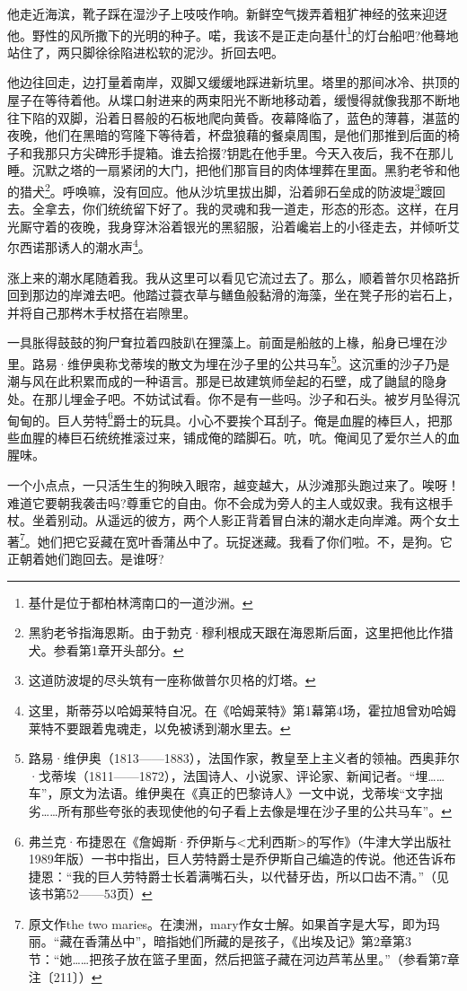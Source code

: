 \par 他走近海滨，靴子踩在湿沙子上吱吱作响。新鲜空气拨弄着粗犷神经的弦来迎迓他。野性的风所撒下的光明的种子。喏，我该不是正走向基什\footnote{基什是位于都柏林湾南口的一道沙洲。}的灯台船吧?他蓦地站住了，两只脚徐徐陷进松软的泥沙。折回去吧。
\par 他边往回走，边打量着南岸，双脚又缓缓地踩进新坑里。塔里的那间冰冷、拱顶的屋子在等待着他。从堞口射进来的两束阳光不断地移动着，缓慢得就像我那不断地往下陷的双脚，沿着日晷般的石板地爬向黄昏。夜幕降临了，蓝色的薄暮，湛蓝的夜晚，他们在黑暗的穹隆下等待着，杯盘狼藉的餐桌周围，是他们那推到后面的椅子和我那只方尖碑形手提箱。谁去拾掇?钥匙在他手里。今天入夜后，我不在那儿睡。沉默之塔的一扇紧闭的大门，把他们那盲目的肉体埋葬在里面。黑豹老爷和他的猎犬\footnote{黑豹老爷指海恩斯。由于勃克·穆利根成天跟在海恩斯后面，这里把他比作猎犬。参看第1章开头部分。}。呼唤嘛，没有回应。他从沙坑里拔出脚，沿着卵石垒成的防波堤\footnote{这道防波堤的尽头筑有一座称做普尔贝格的灯塔。}踱回去。全拿去，你们统统留下好了。我的灵魂和我一道走，形态的形态。这样，在月光厮守着的夜晚，我身穿沐浴着银光的黑貂服，沿着巉岩上的小径走去，并倾听艾尔西诺那诱人的潮水声\footnote{这里，斯蒂芬以哈姆莱特自况。在《哈姆莱特》第1幕第4场，霍拉旭曾劝哈姆莱特不要跟着鬼魂走，以免被诱到潮水里去。}。
\par 涨上来的潮水尾随着我。我从这里可以看见它流过去了。那么，顺着普尔贝格路折回到那边的岸滩去吧。他踏过蓑衣草与鳝鱼般黏滑的海藻，坐在凳子形的岩石上，并将自己那梣木手杖搭在岩隙里。
\par 一具胀得鼓鼓的狗尸耷拉着四肢趴在狸藻上。前面是船舷的上椽，船身已埋在沙里。路易·维伊奥称戈蒂埃的散文为埋在沙子里的公共马车\footnote{路易·维伊奥（1813——1883），法国作家，教皇至上主义者的领袖。西奥菲尔·戈蒂埃（1811——1872），法国诗人、小说家、评论家、新闻记者。“埋……车”，原文为法语。维伊奥在《真正的巴黎诗人》一文中说，戈蒂埃“文字拙劣……所有那些夸张的表现使他的句子看上去像是埋在沙子里的公共马车”。}。这沉重的沙子乃是潮与风在此积累而成的一种语言。那是已故建筑师垒起的石壁，成了鼬鼠的隐身处。在那儿埋金子吧。不妨试试看。你不是有一些吗。沙子和石头。被岁月坠得沉甸甸的。巨人劳特\footnote{弗兰克·布捷恩在《詹姆斯·乔伊斯与<尤利西斯>的写作》（牛津大学出版社1989年版）一书中指出，巨人劳特爵士是乔伊斯自己编造的传说。他还告诉布捷恩：“我的巨人劳特爵士长着满嘴石头，以代替牙齿，所以口齿不清。”（见该书第52——53页）}爵士的玩具。小心不要挨个耳刮子。俺是血腥的棒巨人，把那些血腥的棒巨石统统推滚过来，铺成俺的踏脚石。吭，吭。俺闻见了爱尔兰人的血腥味。
\par 一个小点点，一只活生生的狗映入眼帘，越变越大，从沙滩那头跑过来了。唉呀！难道它要朝我袭击吗?尊重它的自由。你不会成为旁人的主人或奴隶。我有这根手杖。坐着别动。从遥远的彼方，两个人影正背着冒白沫的潮水走向岸滩。两个女土著\footnote{原文作the two maries。在澳洲，mary作女士解。如果首字是大写，即为玛丽。“藏在香蒲丛中”，暗指她们所藏的是孩子，《出埃及记》第2章第3节：“她……把孩子放在篮子里面，然后把篮子藏在河边芦苇丛里。”（参看第7章注〔211〕）}。她们把它妥藏在宽叶香蒲丛中了。玩捉迷藏。我看了你们啦。不，是狗。它正朝着她们跑回去。是谁呀?
